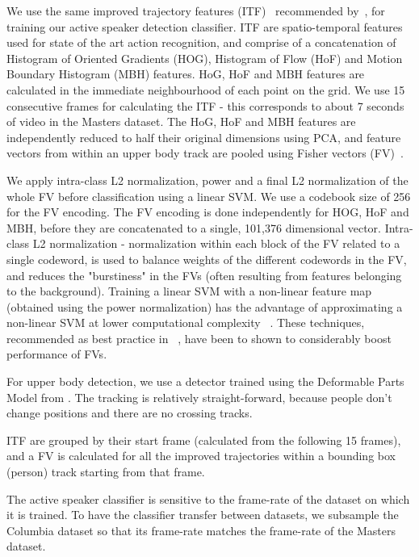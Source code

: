 \documentclass[runningheads]{llncs}
\begin{document}
We use the same improved trajectory features (ITF)~\cite{Wang13} recommended by~\cite{Chakravarty15}, for training our active speaker detection classifier. ITF are spatio-temporal features used for state of the art action recognition, and comprise of a concatenation of Histogram of Oriented Gradients (HOG), Histogram of Flow (HoF) and Motion Boundary Histogram (MBH) features. HoG, HoF and MBH features are calculated in the immediate neighbourhood of each point on the grid. We use 15 consecutive frames for calculating the ITF - this corresponds to about 7 seconds of video in the Masters dataset. The HoG, HoF and MBH features are independently reduced to half their original dimensions using PCA, and feature vectors from within an upper body track are pooled using  Fisher vectors (FV)~\cite{Perronnin10}.

We apply intra-class L2 normalization, power and a final L2 normalization of the whole FV before  classification using a linear SVM. We use a codebook size of 256 for the FV encoding. The FV encoding is done independently for HOG, HoF and MBH, before they are concatenated to a single, 101,376 dimensional vector. Intra-class L2 normalization - normalization within each block of the FV related to a single codeword, is used to balance weights of the different codewords in the FV, and  reduces the "burstiness" in the FVs (often resulting from features belonging to the background). Training a linear SVM with a non-linear feature map (obtained using the power normalization) has the advantage of approximating a non-linear SVM at lower computational complexity ~\cite{Vedaldi12}.
These techniques, recommended as best practice in ~\cite{Peng14}, have been to shown to considerably boost performance of FVs. 

For upper body detection, we use a detector trained using the Deformable Parts Model from \cite{voc-release5}. The tracking is relatively straight-forward, because people don't change positions and there are no crossing tracks.

ITF are grouped by their start frame (calculated from the following 15 frames), and a FV is calculated for all the improved trajectories within a bounding box (person) track starting from that frame.

The active speaker classifier is sensitive to the frame-rate of the dataset on which it is trained. To have the classifier transfer between datasets, we subsample the Columbia dataset so that its frame-rate matches the frame-rate of the Masters dataset.
\end{document}

